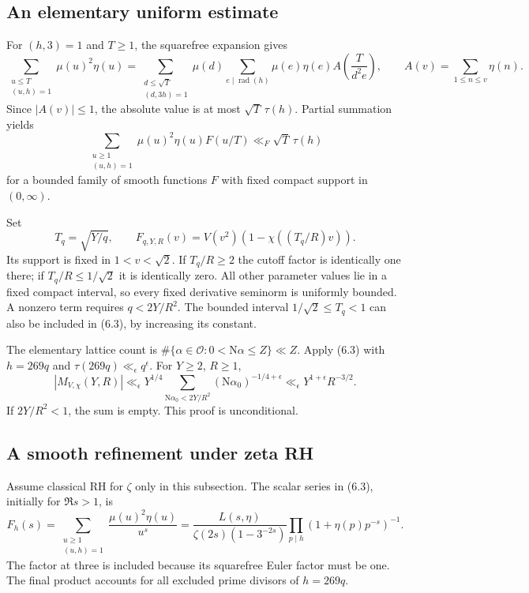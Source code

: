 \documentclass[11pt]{article}
\newcommand{\N}{\mathrm N}
\begin{document}
\subsection{An elementary uniform estimate}

For $(h,3)=1$ and $T\ge1$, the squarefree expansion gives
\[
 \sum_{\substack{u\le T\\(u,h)=1}}\mu(u)^2\eta(u)
 =\sum_{\substack{d\le\sqrt T\\(d,3h)=1}}\mu(d)
   \sum_{e\mid\operatorname{rad}(h)}\mu(e)\eta(e)
       A\left(\frac{T}{d^2e}\right),\qquad
 A(v)=\sum_{1\le n\le v}\eta(n).
\]
Since $|A(v)|\le1$, the absolute value is at most
$\sqrt T\,\tau(h)$. Partial summation yields
\[
 \sum_{\substack{u\ge1\\(u,h)=1}}\mu(u)^2\eta(u)F(u/T)
       \ll_F\sqrt T\,\tau(h)                              \tag{6.3}
\]
for a bounded family of smooth functions $F$ with fixed compact
support in $(0,\infty)$.

Set
\[
 T_q=\sqrt{Y/q},\qquad
 F_{q,Y,R}(v)=V(v^2)(1-\chi((T_q/R)v)).
\]
Its support is fixed in $1<v<\sqrt2$.
If $T_q/R\ge2$ the cutoff factor is identically one there;
if $T_q/R\le1/\sqrt2$ it is identically zero.
All other parameter values lie in a fixed compact interval,
so every fixed derivative seminorm is uniformly bounded.
A nonzero term requires $q<2Y/R^2$.
The bounded interval $1/\sqrt2\le T_q<1$ can also be included
in (6.3), by increasing its constant.

The elementary lattice count is
$\#\{\alpha\in\mathcal O:0<\N\alpha\le Z\}\ll Z$.
Apply (6.3) with $h=269q$ and
$\tau(269q)\ll_\epsilon q^\epsilon$. For $Y\ge2$, $R\ge1$,
\[
 |M_{V,\chi}(Y,R)|
 \ll_\epsilon
 Y^{1/4}\sum_{\N\alpha_0<2Y/R^2}
                  (\N\alpha_0)^{-1/4+\epsilon}
 \ll_\epsilon Y^{1+\epsilon}R^{-3/2}.                    \tag{6.4}
\]
If $2Y/R^2<1$, the sum is empty.
This proof is unconditional.

\subsection{A smooth refinement under zeta RH}

Assume classical RH for $\zeta$ only in this subsection.
The scalar series in (6.3), initially for $\Re s>1$, is
\[
 F_h(s)=\sum_{\substack{u\ge1\\(u,h)=1}}
       \frac{\mu(u)^2\eta(u)}{u^s}
 =\frac{L(s,\eta)}
        {\zeta(2s)(1-3^{-2s})}
       \prod_{p\mid h}(1+\eta(p)p^{-s})^{-1}.              \tag{6.5}
\]
The factor at three is included because its squarefree Euler
factor must be one. The final product accounts for all excluded
prime divisors of $h=269q$.
\end{document}
